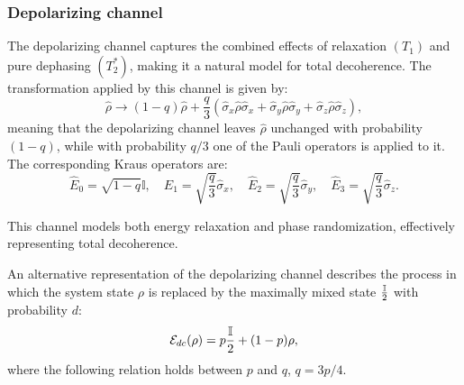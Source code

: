 \subsubsection{Depolarizing channel}
The depolarizing channel captures the combined effects of relaxation $(T_1)$ and pure dephasing $(T_2^*)$, making it a natural model for total decoherence. The transformation applied by this channel is given by:
\begin{equation}
    \hat{\rho} \rightarrow (1 - q) \hat{\rho} + \frac{q}{3} (\hat{\sigma}_x \hat{\rho} \hat{\sigma}_x + \hat{\sigma}_y \hat{\rho} \hat{\sigma}_y + \hat{\sigma}_z \hat{\rho} \hat{\sigma}_z),
\end{equation}
meaning that the depolarizing channel leaves  $\hat{\rho}$ unchanged with probability $(1-q)$, while with probability $q/3$ one of the Pauli operators is applied to it.
The corresponding Kraus operators are:
\begin{equation}
    \hat{E}_0 = \sqrt{1 - q} \mathbb{I}, \quad
    \hat{E}_1 = \sqrt{\frac{q}{3}} \hat{\sigma}_x, \quad
    \hat{E}_2 = \sqrt{\frac{q}{3}} \hat{\sigma}_y, \quad
    \hat{E}_3 = \sqrt{\frac{q}{3}} \hat{\sigma}_z.
\end{equation}

This channel models both energy relaxation and phase randomization, effectively representing total decoherence.

An alternative representation of the depolarizing channel describes the process in which the system state $\rho$ is replaced by the maximally mixed state $\frac{\mathbb{I}}{2}$ with probability $d$:
\begin{equation}\label{eq:depolarizing_channel}
    \mathcal{E}_{dc}(\rho) = p\frac{\mathbb{I}}{2}+(1-p)\rho,
\end{equation}
where the following relation holds between  $p$ and $q$, $q=3p/4$.